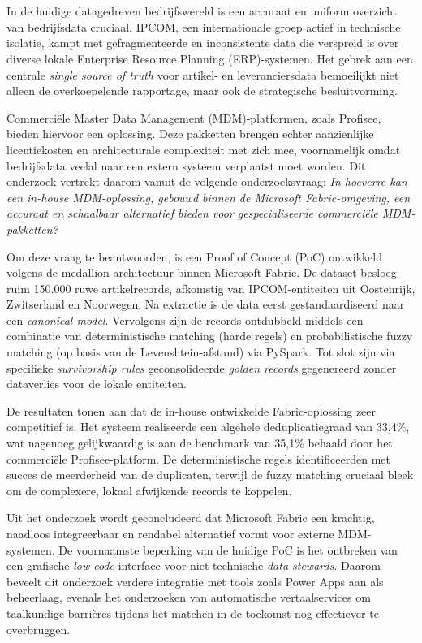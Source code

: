 
\chapter*{}

In de huidige datagedreven bedrijfswereld is een accuraat en uniform overzicht van bedrijfsdata cruciaal. IPCOM, een internationale groep actief in technische isolatie, kampt met gefragmenteerde en inconsistente data die verspreid is over diverse lokale Enterprise Resource Planning (ERP)-systemen. Het gebrek aan een centrale \textit{single source of truth} voor artikel- en leveranciersdata bemoeilijkt niet alleen de overkoepelende rapportage, maar ook de strategische besluitvorming. 

Commerciële Master Data Management (MDM)-platformen, zoals Profisee, bieden hiervoor een oplossing. Deze pakketten brengen echter aanzienlijke licentiekosten en architecturale complexiteit met zich mee, voornamelijk omdat bedrijfsdata veelal naar een extern systeem verplaatst moet worden. Dit onderzoek vertrekt daarom vanuit de volgende onderzoeksvraag: \textit{In hoeverre kan een in-house MDM-oplossing, gebouwd binnen de Microsoft Fabric-omgeving, een accuraat en schaalbaar alternatief bieden voor gespecialiseerde commerciële MDM-pakketten?}

Om deze vraag te beantwoorden, is een Proof of Concept (PoC) ontwikkeld volgens de medallion-architectuur binnen Microsoft Fabric. De dataset besloeg ruim 150.000 ruwe artikelrecords, afkomstig van IPCOM-entiteiten uit Oostenrijk, Zwitserland en Noorwegen. Na extractie is de data eerst gestandaardiseerd naar een \textit{canonical model}. Vervolgens zijn de records ontdubbeld middels een combinatie van deterministische matching (harde regels) en probabilistische fuzzy matching (op basis van de Levenshtein-afstand) via PySpark. Tot slot zijn via specifieke \textit{survivorship rules} geconsolideerde \textit{golden records} gegenereerd zonder dataverlies voor de lokale entiteiten.

De resultaten tonen aan dat de in-house ontwikkelde Fabric-oplossing zeer competitief is. Het systeem realiseerde een algehele deduplicatiegraad van 33,4\%, wat nagenoeg gelijkwaardig is aan de benchmark van 35,1\% behaald door het commerciële Profisee-platform. De deterministische regels identificeerden met succes de meerderheid van de duplicaten, terwijl de fuzzy matching cruciaal bleek om de complexere, lokaal afwijkende records te koppelen. 

Uit het onderzoek wordt geconcludeerd dat Microsoft Fabric een krachtig, naadloos integreerbaar en rendabel alternatief vormt voor externe MDM-systemen. De voornaamste beperking van de huidige PoC is het ontbreken van een grafische \textit{low-code} interface voor niet-technische \textit{data stewards}. Daarom beveelt dit onderzoek verdere integratie met tools zoals Power Apps aan als beheerlaag, evenals het onderzoeken van automatische vertaalservices om taalkundige barrières tijdens het matchen in de toekomst nog effectiever te overbruggen.